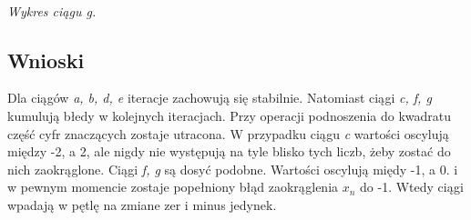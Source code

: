 \documentclass[]{article}
\begin{document}
\\
\textit{Wykres ciągu g.}
\\
\subsection{Wnioski}
Dla ciągów \textit{a, b, d, e} iteracje zachowują się stabilnie. Natomiast ciągi \textit{c, f, g} kumulują błedy w kolejnych iteracjach. Przy operacji podnoszenia do kwadratu część cyfr znaczących zostaje utracona. W przypadku ciągu \textit{c} wartości oscylują między -2, a 2, ale nigdy nie występują na tyle blisko tych liczb, żeby zostać do nich zaokrąglone. Ciągi \textit{f, g} są dosyć podobne. Wartości oscylują międy -1, a 0. i w pewnym momencie zostaje popełniony błąd zaokrąglenia $x_n$ do -1. Wtedy ciągi wpadają w pętlę na zmiane zer i minus jedynek.  
\end{document}
